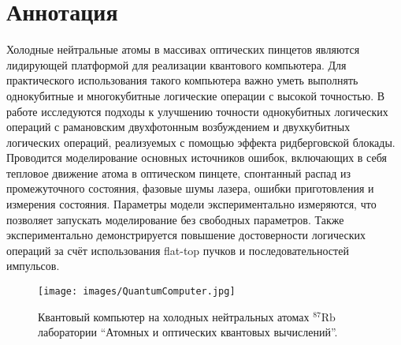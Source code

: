 \section*{Аннотация}

Холодные нейтральные атомы в массивах оптических пинцетов являются лидирующей платформой для реализации квантового компьютера. Для практического использования такого компьютера важно уметь выполнять однокубитные и многокубитные логические операции с высокой точностью. В работе исследуются подходы к улучшению точности однокубитных логических операций с рамановским двухфотонным возбуждением и двухкубитных логических операций, реализуемых с помощью эффекта ридберговской блокады. Проводится моделирование основных источников ошибок, включающих в себя тепловое движение атома в оптическом пинцете, спонтанный распад из промежуточного состояния, фазовые шумы лазера, ошибки приготовления и измерения состояния. Параметры модели экспериментально измеряются, что позволяет запускать моделирование без свободных параметров. Также экспериментально демонстрируется повышение достоверности логических операций за счёт использования flat-top пучков и последовательностей импульсов. 

\vspace{4em}
\begin{figure}[ht]
	\centering
	\texttt{[image: images/QuantumComputer.jpg]}
	\caption{Квантовый компьютер на холодных нейтральных атомах $^{87}\text{Rb}$ лаборатории ``Атомных и оптических квантовых вычислений''.}
\end{figure}

\newpage